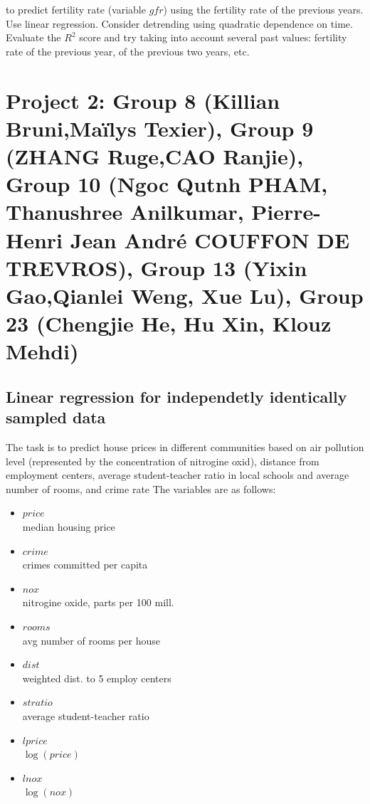\documentclass{article}
\begin{document}
   to predict fertility rate (variable $gfr$)
    using the fertility rate of the previous years. 
    Use linear regression. Consider detrending using quadratic dependence on time.  
   Evaluate the $R^2$ score and try taking into account several past values: fertility rate of the previous year, of the previous two years, etc. 



\section*{Project 2: Group 8 (Killian Bruni,Maïlys Texier), Group 9 (ZHANG Ruge,CAO Ranjie), Group 10 (Ngoc Qutnh PHAM, Thanushree Anilkumar, Pierre-Henri Jean André COUFFON DE TREVROS), Group 13 (Yixin Gao,Qianlei Weng, Xue Lu), 
 Group 23 (Chengjie He, Hu Xin, Klouz Mehdi)}
 \subsection*{Linear regression for independetly identically sampled data}
    The task is to predict house prices in different communities based on air pollution level (represented by the concentration of nitrogine oxid), 
distance from employment centers, average student-teacher ratio 
 in local schools and average number of rooms, and crime rate The variables are as follows:
    \begin{itemize}
    \item{$price$ \\}       
	median housing price
    \item{$crime$ \\}                    
		crimes committed per capita
    \item{$nox$ \\}                      
	nitrogine oxide, parts per 100 mill.
    \item{$rooms$ \\}                    
    avg number of rooms per house
    \item{$dist$ \\}                     
      weighted dist. to 5 employ centers
    \item{$stratio$ \\}                  average student-teacher ratio
    \item{$lprice$ \\}                   $\log(price)$
    \item{$lnox$ \\}                     $\log(nox)$
   \end{itemize}
\end{document}

